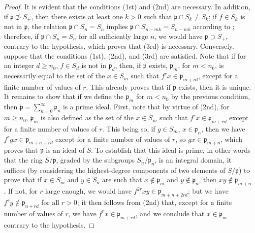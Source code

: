 \begin{proof}
It is evident that the conditions (1st) and (2nd) are necessary.
In addition, if $\mathfrak{p}\not\supset S_+$, then there exists at least one $k>0$ such that $\mathfrak{p}\cap S_k\neq S_k$;
if $f\in S_k$ is not in $\mathfrak{p}$, the relation $\mathfrak{p}\cap S_n=S_n$ implies $\mathfrak{p}\cap S_{n-mk}=S_{n-mk}$ according to ;
therefore, if $\mathfrak{p}\cap S_n=S_n$ for all sufficiently large $n$, we would have $\mathfrak{p}\supset S_+$, contrary to the hypothesis, which proves that (3rd) is necessary.
Conversely, suppose that the conditions (1st), (2nd), and (3rd) are satisfied.
Note that if for an integer $d\geq n_0$, $f\in S_d$ is not in $\mathfrak{p}_d$, then, if $\mathfrak{p}$ exists, $\mathfrak{p}_m$, for $m<n_0$, is necessarily equal to the set of the $x\in S_m$ such that $f^r x\in\mathfrak{p}_{m+rd}$, except for a finite number of values of $r$.
This already proves that if $\mathfrak{p}$ exists, then it is unique.
It remains to show that if we define the $\mathfrak{p}_m$ for $m<n_0$ by the previous condition, then $\mathfrak{p}=\sum_{n=0}^\infty\mathfrak{p}_n$ is a prime ideal.
First, note that by virtue of (2nd), for $m\geq n_0$, $\mathfrak{p}_m$ is also defined as the set of the $x\in S_m$ such that $f^r x\in\mathfrak{p}_{m+rd}$ except for a finite number of values of $r$.
This
being so, if $g\in S_m$, $x\in\mathfrak{p}_n$, then we have $f^r gx\in\mathfrak{p}_{m+n+rd}$ except for a finite number of values of $r$, so $gx\in\mathfrak{p}_{m+n}$, which proves that $\mathfrak{p}$ is an ideal of $S$.
To establish that this ideal is prime, in other words that the ring $S/\mathfrak{p}$, graded by the subgroups $S_n/\mathfrak{p}_n$, is an integral domain, it suffices (by considering the highest-degree components of two elements of $S/\mathfrak{p}$) to prove that if $x\in S_m$ and $y\in S_n$ are such that $x\not\in\mathfrak{p}_m$ and $y\not\in\mathfrak{p}_n$, then $xy\not\in\mathfrak{p}_{m+n}$.
If not, for $r$ large enough, we would have $f^{2r}xy\in\mathfrak{p}_{m+n+2rd}$;
but we have $f^r y\not\in\mathfrak{p}_{n+rd}$ for all $r>0$;
it then follows from (2nd) that, except for a finite number of values of $r$, we have $f^r x\in\mathfrak{p}_{m+rd}$, and we conclude that $x\in\mathfrak{p}_m$ contrary to the hypothesis.
\end{proof}

